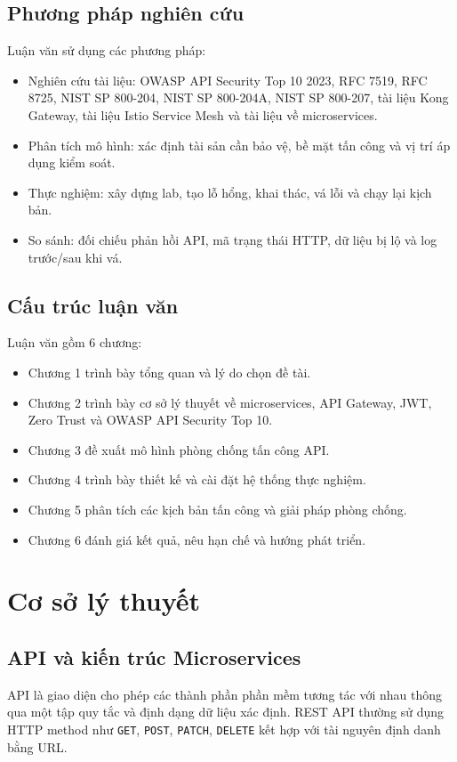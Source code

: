 \documentclass[14pt,a4paper]{extreport}
\begin{document}
\section{Phương pháp nghiên cứu}
Luận văn sử dụng các phương pháp:
\begin{itemize}
  \item Nghiên cứu tài liệu: OWASP API Security Top 10 2023, RFC 7519, RFC 8725, NIST SP 800-204, NIST SP 800-204A, NIST SP 800-207, tài liệu Kong Gateway, tài liệu Istio Service Mesh và tài liệu về microservices.
  \item Phân tích mô hình: xác định tài sản cần bảo vệ, bề mặt tấn công và vị trí áp dụng kiểm soát.
  \item Thực nghiệm: xây dựng lab, tạo lỗ hổng, khai thác, vá lỗi và chạy lại kịch bản.
  \item So sánh: đối chiếu phản hồi API, mã trạng thái HTTP, dữ liệu bị lộ và log trước/sau khi vá.
\end{itemize}

\section{Cấu trúc luận văn}
Luận văn gồm 6 chương:
\begin{itemize}
  \item Chương 1 trình bày tổng quan và lý do chọn đề tài.
  \item Chương 2 trình bày cơ sở lý thuyết về microservices, API Gateway, JWT, Zero Trust và OWASP API Security Top 10.
  \item Chương 3 đề xuất mô hình phòng chống tấn công API.
  \item Chương 4 trình bày thiết kế và cài đặt hệ thống thực nghiệm.
  \item Chương 5 phân tích các kịch bản tấn công và giải pháp phòng chống.
  \item Chương 6 đánh giá kết quả, nêu hạn chế và hướng phát triển.
\end{itemize}

\chapter{Cơ sở lý thuyết}

\section{API và kiến trúc Microservices}
API là giao diện cho phép các thành phần phần mềm tương tác với nhau thông qua một tập quy tắc và định dạng dữ liệu xác định. REST API thường sử dụng HTTP method như \texttt{GET}, \texttt{POST}, \texttt{PATCH}, \texttt{DELETE} kết hợp với tài nguyên định danh bằng URL.
\end{document}
